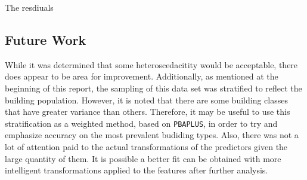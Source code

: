 The resdiuals

\subsection{Future Work}
While it was determined that some heteroscedacitity would be acceptable, there does appear to be area for improvement.  Additionally, as mentioned at the beginning of this report, the sampling of this data set was stratified to reflect the building population.  However, it is noted that there are some building classes that have greater variance than others.  Therefore, it may be useful to use this stratification as a weighted method, based on \lstinline{PBAPLUS}, in order to try and emphasize accuracy on the most prevalent budiding types. Also, there was not a lot of attention paid to the actual transformations of the predictors given the large quantity of them.  It is possible a better fit can be obtained with more intelligent transformations applied to the features after further analysis.


